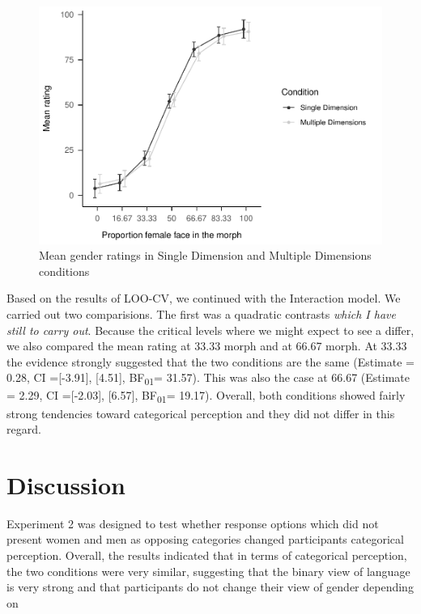 \documentclass[
  man]{apa7}
\begin{document}
\begin{figure}
\centering
\includegraphics{resp_opts_manus23022_files/figure-latex/exp-two-inf-1.pdf}
\caption{\label{fig:exp-two-inf}Mean gender ratings in Single Dimension and Multiple Dimensions conditions}
\end{figure}

Based on the results of LOO-CV, we continued with the Interaction model. We carried out two comparisions. The first was a quadratic contrasts \emph{which I have still to carry out}. Because the critical levels where we might expect to see a differ, we also compared the mean rating at 33.33 morph and at 66.67 morph. At 33.33 the evidence strongly suggested that the two conditions are the same
(Estimate = 0.28, CI ={[}-3.91{]}, {[}4.51{]}, BF\textsubscript{01}= 31.57). This was also the case at 66.67
(Estimate = 2.29, CI ={[}-2.03{]}, {[}6.57{]}, BF\textsubscript{01}= 19.17). Overall, both conditions showed fairly strong tendencies toward categorical perception and they did not differ in this regard.

\hypertarget{discussion-1}{%
\section{Discussion}\label{discussion-1}}

Experiment 2 was designed to test whether response options which did not present women and men as opposing categories changed participants categorical perception. Overall, the results indicated that in terms of categorical perception, the two conditions were very similar, suggesting that the binary view of language is very strong and that participants do not change their view of gender depending on
\end{document}

